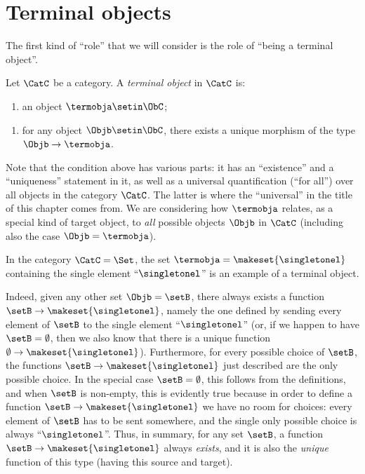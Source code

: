 
\section{Terminal objects}
\label{sec:terminal}

The first kind of ``role'' that we will consider is the role of ``being a terminal object''.

\begin{ctdefinition}\label{def:terminal-object}
    Let $\CatC$ be a category.
    A \emph{terminal object} in $\CatC$ is:

    \constit
    \begin{enumerate}
        \item an object $\termobja \setin \ObC$;
    \end{enumerate}
    \condit
    \begin{enumerate}
        \item for any object $\Objb \setin \ObC$, there exists a unique morphism of the type $\Objb \to \termobja$.
    \end{enumerate}
\end{ctdefinition}

Note that the condition above has various parts: it has an ``existence'' and a ``uniqueness'' statement in it, as well as a universal quantification (``for all'') over all objects in the category $\CatC$. The latter is where the ``universal'' in the title of this chapter comes from. We are considering how $\termobja$ relates, as a special kind of target object, to \emph{all} possible objects $\Objb$ in $\CatC$ (including also the case $\Objb = \termobja$). 



\begin{example}\label{exa:terminal-object-in-Set}
    In the category $\CatC = \Set$, the set $\termobja = \makeset{ \singletonel}$ containing the single element ``$\singletonel$'' is an example of a terminal object.

    Indeed, given any other set $\Objb = \setB$, there always exists a function $\setB \to \makeset{ \singletonel}$, namely the one defined by sending every element of $\setB$ to the single element ``$\singletonel$'' (or, if we happen to have $\setB = \emptyset$, then we also know that there is a unique function $\emptyset \to \makeset{ \singletonel}$).
    Furthermore, for every possible choice of $\setB$, the functions $\setB \to \makeset{ \singletonel}$ just described are the only possible choice.
    In the special case $\setB = \emptyset$, this follows from the definitions, and when $\setB$ is non-empty, this is evidently true because in order to define a function $\setB \to \makeset{ \singletonel}$ we have no room for choices: every element of $\setB$ has to be sent somewhere, and the single only possible choice is always ``$\singletonel$''.
    Thus, in summary, for any set $\setB$, a function $\setB \to \makeset{ \singletonel}$ always \emph{exists}, and it is also the \emph{unique} function of this type (having this source and target).
\end{example}

